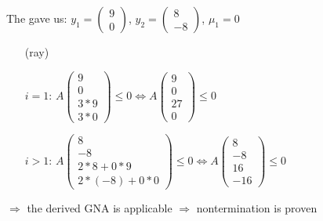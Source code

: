 \begin{frame}
	\begin{example}
		The \solver gave us: $y_1=\begin{pmatrix} 9 \\ 0 \end{pmatrix}$, $y_2=\begin{pmatrix} 8 \\ -8 \end{pmatrix}$, $\mu_1=0$\newline
		\begin{itemize}
			\setlength{\itemindent}{0.5cm}
			\item[(ray)]
			\item[$i=1$:]  $A\begin{pmatrix} 9 \\ 0 \\ 3*9 \\ 3*0 \end{pmatrix} \le 0 \Leftrightarrow A\begin{pmatrix} 9 \\ 0 \\ 27 \\ 0 \end{pmatrix} \le 0$ \checkmark
			\item[$i>1$:] $A\begin{pmatrix} 8 \\ -8 \\ 2*8+0*9 \\ 2*(-8)+0*0 \end{pmatrix} \le 0 \Leftrightarrow A\begin{pmatrix} 8 \\ -8 \\ 16 \\ -16 \end{pmatrix} \le 0$ \checkmark
		\end{itemize}
		$\Rightarrow$ the derived GNA is applicable $\Rightarrow$ nontermination is proven
	\end{example}
\end{frame}






